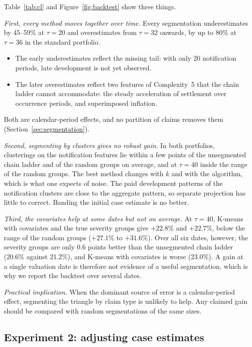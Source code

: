 Table~\ref{tab:cl} and Figure~\ref{fig:backtest} show three things.

\emph{First, every method moves together over time.} Every segmentation underestimates by 45--59\% at $\tau=20$ and overestimates from $\tau=32$ onwards, by up to 80\% at $\tau=36$ in the standard portfolio.
\begin{itemize}[leftmargin=*]
\item The early underestimates reflect the missing tail: with only 20 notification periods, late development is not yet observed.
\item The later overestimates reflect two features of Complexity~5 that the chain ladder cannot accommodate: the steady acceleration of settlement over occurrence periods, and superimposed inflation.
\end{itemize}
Both are calendar-period effects, and no partition of claims removes them (Section~\ref{sec:segmentation}).

\emph{Second, segmenting by clusters gives no robust gain.} In both portfolios, clusterings on the notification features lie within a few points of the unsegmented chain ladder and of the random groups on average, and at $\tau=40$ inside the range of the random groups. The best method changes with $k$ and with the algorithm, which is what one expects of noise. The paid development patterns of the notification clusters are close to the aggregate pattern, so separate projection has little to correct. Banding the initial case estimate is no better.

\emph{Third, the covariates help at some dates but not on average.} At $\tau=40$, K-means with covariates and the true severity groups give $+22.8\%$ and $+22.7\%$, below the range of the random groups ($+27.1\%$ to $+31.6\%$). Over all six dates, however, the severity groups are only 0.6 points better than the unsegmented chain ladder (20.6\% against 21.2\%), and K-means with covariates is worse (23.0\%). A gain at a single valuation date is therefore not evidence of a useful segmentation, which is why we report the backtest over several dates.

\emph{Practical implication.} When the dominant source of error is a calendar-period effect, segmenting the triangle by claim type is unlikely to help. Any claimed gain should be compared with random segmentations of the same sizes.

\subsection{Experiment 2: adjusting case estimates}
\label{sec:res-oot}

